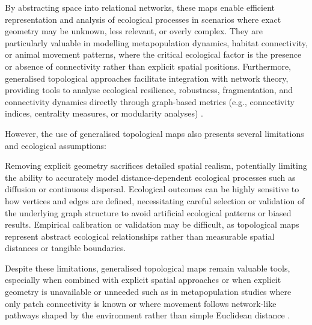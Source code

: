 By abstracting space into relational networks, these maps enable efficient representation and analysis of ecological processes in scenarios where exact geometry may be unknown, less relevant, or overly complex. They are particularly valuable in modelling metapopulation dynamics, habitat connectivity, or animal movement patterns, where the critical ecological factor is the presence or absence of connectivity rather than explicit spatial positions. Furthermore, generalised topological approaches facilitate integration with network theory, providing tools to analyse ecological resilience, robustness, fragmentation, and connectivity dynamics directly through graph-based metrics (e.g., connectivity indices, centrality measures, or modularity analyses) \cite{Lemiere2023,Gaucherel2012}.

However, the use of generalised topological maps also presents several limitations and ecological assumptions:
\begin{Itemize}
    \Item{} Removing explicit geometry sacrifices detailed spatial realism, potentially limiting the ability to accurately model distance-dependent ecological processes such as diffusion or continuous dispersal.
    \Item{} Ecological outcomes can be highly sensitive to how vertices and edges are defined, necessitating careful selection or validation of the underlying graph structure to avoid artificial ecological patterns or biased results.
    \Item{} Empirical calibration or validation may be difficult, as topological maps represent abstract ecological relationships rather than measurable spatial distances or tangible boundaries.
\end{Itemize}

Despite these limitations, generalised topological maps remain valuable tools, especially when combined with explicit spatial approaches \cite{Ecormier-Nocca2021} or when explicit geometry is unavailable or unneeded such as in metapopulation studies where only patch connectivity is known \cite{Duflot2018} or where movement follows network-like pathways shaped by the environment rather than simple Euclidean distance \cite{Boussange2022,Mari2014,Carrara2012}.

\midConclusion


